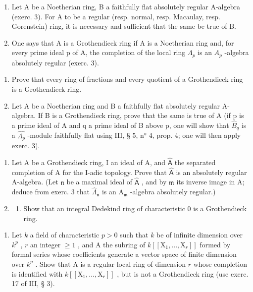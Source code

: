 \begin{enumerate}
\def\labelenumi{\arabic{enumi})}
\setcounter{enumi}{3}
\item
  Let A be a Noetherian ring, B a faithfully flat absolutely regular A-algebra (exerc. 3). For A to be a regular (resp. normal, resp. Macaulay, resp. Gorenstein) ring, it is necessary and sufficient that the same be true of B.
\item
  One says that A is a Grothendieck ring if A is a Noetherian ring and, for every prime ideal p of A, the completion of the local ring \(\Lambda_{p}\) is an \(A_{p}\) -algebra absolutely regular (exerc. 3).
\end{enumerate}

\begin{enumerate}
\def\labelenumi{\alph{enumi})}
\item
  Prove that every ring of fractions and every quotient of a Grothendieck ring is a Grothendieck ring.
\item
  Let A be a Noetherian ring and B a faithfully flat absolutely regular A-algebra. If B is a Grothendieck ring, prove that the same is true of A (if p is a prime ideal of A and q a prime ideal of B above p, one will show that \(\widehat{B}_{q}\) is a \(\widehat{\Lambda_{p}}\) -module faithfully flat using III, § 5, n° 4, prop. 4; one will then apply exerc. 3).
\end{enumerate}

\begin{enumerate}
\def\labelenumi{\arabic{enumi})}
\setcounter{enumi}{5}
\item
  Let A be a Grothendieck ring, I an ideal of A, and \(\widehat{\mathsf{A}}\) the separated completion of A for the I-adic topology. Prove that \(\widehat{\mathsf{A}}\) is an absolutely regular A-algebra. (Let \(\mathfrak{n}\) be a maximal ideal of \(\widehat{\mathsf{A}}\) , and by \(\mathfrak{m}\) its inverse image in A; deduce from exerc. 3 that \(\widehat{\Lambda}_{\mathfrak{n}}\) is an \(\mathrm{A}_{\mathfrak{m}}\) -algebra absolutely regular.)
\item
  \begin{enumerate}
  \def\labelenumii{\alph{enumii})}
  \tightlist
  \item
    Show that an integral Dedekind ring of characteristic 0 is a Grothendieck ring.
  \end{enumerate}
\end{enumerate}

\begin{enumerate}
\def\labelenumi{\alph{enumi})}
\setcounter{enumi}{1}
\tightlist
\item
  Let \(k\) a field of characteristic \(p > 0\) such that \(k\) be of infinite dimension over \(k^p\) , \(r\) an integer \(\geqslant 1\) , and A the subring of \(k[[\mathrm{X}_1, \ldots, \mathrm{X}_r]]\) formed by formal series whose coefficients generate a vector space of finite dimension over \(k^p\) . Show that A is a regular local ring of dimension \(r\) whose completion is identified with \(k[[\mathrm{X}_1, \ldots, \mathrm{X}_r]]\) , but is not a Grothendieck ring (use exerc. 17 of III, § 3).
\end{enumerate}

